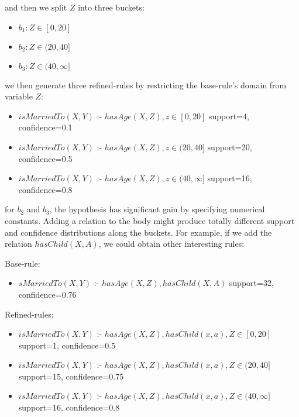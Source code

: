 and then we split $Z$ into three buckets:

\begin{itemize}
 \item $ b_1: Z\in[0,20]$
 \item $ b_2: Z\in(20,40]$
 \item $ b_3: Z\in(40,\infty]$
\end{itemize}

we then generate three refined-rules by restricting the base-rule's domain from variable $Z$:

\begin{itemize}

 \item $isMarriedTo(X,Y)$ :- $hasAge(X,Z), z\in[0,20]$	
    \newline support=4, confidence=0.1
 \item $isMarriedTo(X,Y)$ :- $hasAge(X,Z), z\in(20,40]$	
    \newline support=20, confidence=0.5
 \item $isMarriedTo(X,Y)$ :- $hasAge(X,Z), z\in(40,\infty]$
    \newline support=16, confidence=0.8

\end{itemize}

for $b_2$ and $b_3$, the hypothesis has significant gain by specifying numerical constants. Adding a relation to the
body might produce totally different support and confidence distributions along the buckets. For example, if we add the
relation $hasChild(X,A)$, we could obtain other interesting rules:

Base-rule:
\begin{itemize}
 \item $sMarriedTo(X,Y)$ :- $hasAge(X,Z),hasChild(X,A)$	
    \newline support=32, confidence=0.76
\end{itemize}

Refined-rules:
\begin{itemize}
 \item $isMarriedTo(X,Y)$ :- $hasAge(X,Z),hasChild(x,a), Z\in[0,20]$	
    \newline support=1, confidence=0.5
 \item $isMarriedTo(X,Y)$ :- $hasAge(X,Z),hasChild(x,a), Z\in(20,40]$	
    \newline support=15, confidence=0.75
 \item $isMarriedTo(X,Y)$ :- $hasAge(X,Z),hasChild(x,a), Z\in(40,\infty]$	
    \newline support=16, confidence=0.8
\end{itemize}

